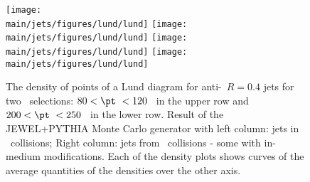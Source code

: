 
\begin{figure}[htbp]
	\centering
	\texttt{[image: \\main/jets/figures/lund/lund]}
	\texttt{[image: \\main/jets/figures/lund/lund]}
	\texttt{[image: \\main/jets/figures/lund/lund]}
	\texttt{[image: \\main/jets/figures/lund/lund]}
	\caption{The density of points of a Lund diagram for anti-\kT\ $R=0.4$ jets for two \pt\ selections: $80 < \pt\ < 120$ \gevc\ in the upper row and $200 < \pt\ < 250$ \gevc\ in the lower row. Result of the JEWEL+PYTHIA Monte Carlo generator with left column: jets in \pp\ collisions; Right column: jets from \PbPb\ collisions - some with in-medium modifications. Each of the density plots shows curves of the average quantities of the densities over the other axis.}
	\label{fig:Lund_jets}
\end{figure}
